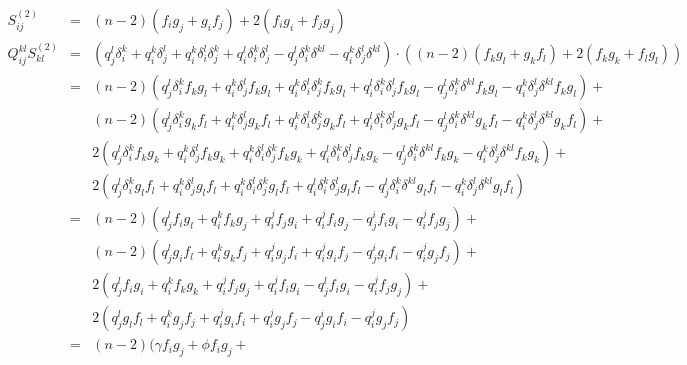 \documentclass{article}
\begin{document}
\begin{eqnarray*}
  S_{ij}^{(2)} &=& (n - 2)(f_ig_j + g_if_j) + 2(f_ig_i + f_jg_j)
\\
  Q_{ij}^{kl}S_{kl}^{(2)} &=& 
                \left(  q_j^l\delta_i^k + 
                        q_i^k\delta_j^l + 
                        q_i^k\delta_i^l\delta_j^k +
                        q_i^l\delta_i^k\delta_j^l -
                        q_j^l\delta_i^k\delta^{kl} -    
                        q_i^k\delta_j^l\delta^{kl}\right)
        \cdot  \left((n-2)(f_kg_l + g_kf_l) + 2(f_kg_k + f_lg_l)\right)\\
&=& (n-2)(q_j^l\delta_i^kf_kg_l + 
          q_i^k\delta_j^lf_kg_l + 
          q_i^k\delta_i^l\delta_j^kf_kg_l +
          q_i^l\delta_i^k\delta_j^lf_kg_l -
          q_j^l\delta_i^k\delta^{kl}f_kg_l -    
          q_i^k\delta_j^l\delta^{kl}f_kg_l)+\\
&&  (n-2)(q_j^l\delta_i^kg_kf_l + 
          q_i^k\delta_j^lg_kf_l + 
          q_i^k\delta_i^l\delta_j^kg_kf_l +
          q_i^l\delta_i^k\delta_j^lg_kf_l -
          q_j^l\delta_i^k\delta^{kl}g_kf_l -    
          q_i^k\delta_j^l\delta^{kl}g_kf_l) +\\
&&       2(q_j^l\delta_i^kf_kg_k + 
          q_i^k\delta_j^lf_kg_k + 
          q_i^k\delta_i^l\delta_j^kf_kg_k +
          q_i^l\delta_i^k\delta_j^lf_kg_k -
          q_j^l\delta_i^k\delta^{kl}f_kg_k -    
          q_i^k\delta_j^l\delta^{kl}f_kg_k)+\\
&&       2(q_j^l\delta_i^kg_lf_l + 
          q_i^k\delta_j^lg_lf_l + 
          q_i^k\delta_i^l\delta_j^kg_lf_l +
          q_i^l\delta_i^k\delta_j^lg_lf_l -
          q_j^l\delta_i^k\delta^{kl}g_lf_l -    
          q_i^k\delta_j^l\delta^{kl}g_lf_l)\\
&=& (n-2)(q_j^lf_ig_l + 
          q_i^kf_kg_j + 
          q_i^jf_jg_i +
          q_i^jf_ig_j -
          q_j^if_ig_i -    
          q_i^jf_jg_j)+\\
&&  (n-2)(q_j^lg_if_l + 
          q_i^kg_kf_j + 
          q_i^jg_jf_i +
          q_i^jg_if_j -
          q_j^ig_if_i -    
          q_i^jg_jf_j) +\\
&&      2(q_j^lf_ig_i + 
          q_i^kf_kg_k + 
          q_i^jf_jg_j +
          q_i^jf_ig_i -
          q_j^lf_ig_i -    
          q_i^jf_jg_j)+\\
&&      2(q_j^lg_lf_l + 
          q_i^kg_jf_j + 
          q_i^jg_if_i +
          q_i^jg_jf_j -
          q_j^ig_if_i -    
          q_i^jg_jf_j)\\
&=& (n-2)(\gamma f_ig_j + 
          \phi   f_ig_j + 

\end{eqnarray*}
\end{document}
